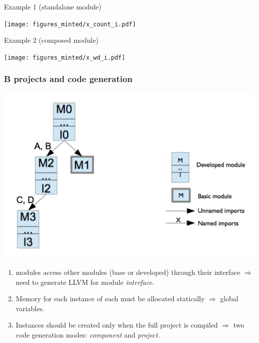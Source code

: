 \documentclass[12pt]{beamer}
\begin{document}
\begin{frame}{Example 1 (standalone module)}

  \begin{center}
    \texttt{[image: figures\_minted/x\_count\_i.pdf]}
  \end{center}
\end{frame}

\begin{frame}{Example 2 (composed module)}

  \begin{center}
    \texttt{[image: figures\_minted/x\_wd\_i.pdf]}
  \end{center}
\end{frame}

\begin{frame}

  \frametitle{B projects and code generation}
	
  \includegraphics[height=.4\textheight]{B-project.pdf}
  \begin{enumerate}
  \item modules access other modules (base or developed) through their interface
    $\Longrightarrow$ need to generate LLVM for module \emph{interface}.
  \item Memory for each instance of each  must be allocated statically
    $\Longrightarrow$ global variables.
  \item Instances should be created only when the full project is compiled
    $\Longrightarrow$ two code generation modes: \emph{component} and 
    \emph{project}.
  \end{enumerate}
\end{frame}
\end{document}
